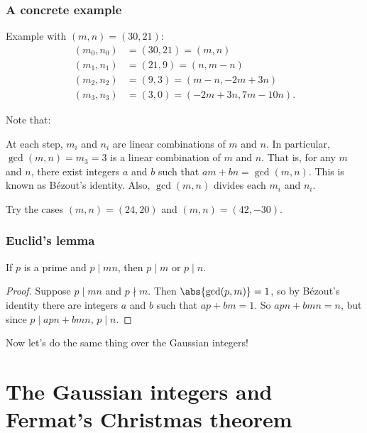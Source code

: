 \documentclass{beamer}
\begin{document}
\begin{frame}
	\frametitle{A concrete example}
	Example with $(m,n) = (30,21)$:
	\begin{align*}
		(m_0,n_0) &= (30,21) = (m,n) \\
		(m_1,n_1) &= (21,9) = (n,m - n) \\
		(m_2,n_2) &= (9,3) = (m - n,-2m + 3n) \\
		(m_3,n_3) &= (3,0) = (-2m + 3n,7m - 10n).
	\end{align*}

	Note that:
	\begin{itemize}
		\ii At each step, $m_i$ and $n_i$ are linear combinations of $m$ and $n$.
		\ii In particular, $\gcd(m,n) = m_3 = 3$ is a linear combination of $m$ and $n$. That is, for any $m$ and $n$, there exist integers $a$ and $b$ such that $am + bn = \gcd(m,n)$. This is known as B\'ezout's identity.
		\ii Also, $\gcd(m,n)$ divides each $m_i$ and $n_i$.
	\end{itemize}
	
	Try the cases $(m,n) = (24,20)$ and $(m,n) = (42,-30)$.
\end{frame}

\begin{frame}
	\frametitle{Euclid's lemma}
	\begin{lemma}
		If $p$ is a prime and $p \mid mn$, then $p \mid m$ or $p \mid n$.
	\end{lemma}
	
	\begin{proof}
		Suppose $p \mid mn$ and $p \nmid m$. Then $\abs{\gcd(p,m)} = 1$, so by B\'ezout's identity there are integers $a$ and $b$ such that $ap + bm = 1$. So $apn + bmn = n$, but since $p \mid apn + bmn$, $p \mid n$.
	\end{proof}

	Now let's do the same thing over the Gaussian integers!
\end{frame}

\section{The Gaussian integers and Fermat's Christmas theorem}
\end{document}

